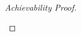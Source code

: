 \begin{proof}[Achievability Proof]
\begin{itemize}
\begin{enumerate}




\end{enumerate}
\end{itemize}
\end{proof}
